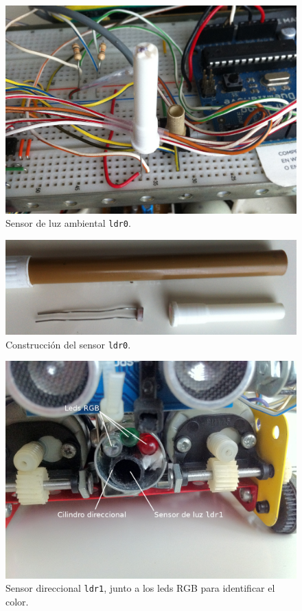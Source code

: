 \documentclass[10pt,a4paper,hidelinks,twocolumn,nobalancelastpage]{article}
\begin{document}
\begin{figure}[H]
\includegraphics[width=\columnwidth]{ldr0.jpg}
\caption{Sensor de luz ambiental \texttt{ldr0}.  \label{fig:foto-ldr0}}
\end{figure}

\begin{figure}[H]
\includegraphics[width=\columnwidth]{ldr0-pieza.jpg}
\caption{Construcción del sensor \texttt{ldr0}.  \label{fig:foto-ldr0-pieza}}
\end{figure}

\begin{figure}[H]
\includegraphics[width=\columnwidth]{ldr1.jpg}
\caption{Sensor direccional \texttt{ldr1}, junto a los leds RGB para identificar 
el color.  \label{fig:foto-ldr1}}
\end{figure}
\end{document}
